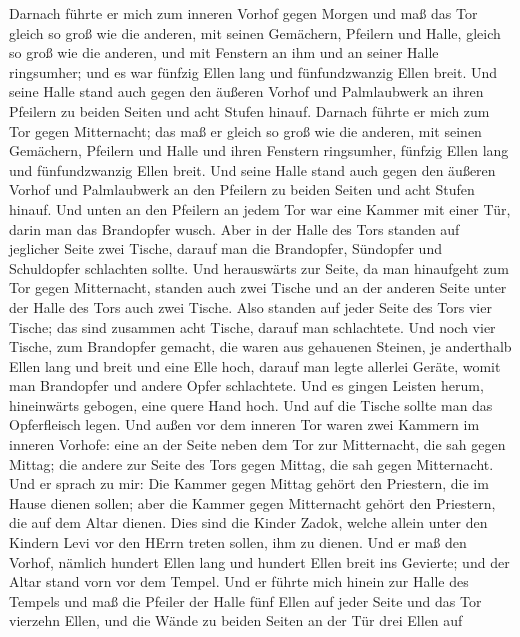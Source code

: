 Darnach führte er mich zum inneren Vorhof gegen Morgen und maß das Tor
gleich so groß wie die anderen,  mit seinen Gemächern,
Pfeilern und Halle, gleich so groß wie die anderen, und mit Fenstern an
ihm und an seiner Halle ringsumher; und es war fünfzig Ellen lang und
fünfundzwanzig Ellen breit.  Und seine Halle stand auch
gegen den äußeren Vorhof und Palmlaubwerk an ihren Pfeilern zu beiden
Seiten und acht Stufen hinauf.  Darnach führte er mich zum
Tor gegen Mitternacht; das maß er gleich so groß wie die anderen,
 mit seinen Gemächern, Pfeilern und Halle und ihren
Fenstern ringsumher, fünfzig Ellen lang und fünfundzwanzig Ellen breit.
 Und seine Halle stand auch gegen den äußeren Vorhof und
Palmlaubwerk an den Pfeilern zu beiden Seiten und acht Stufen hinauf.
 Und unten an den Pfeilern an jedem Tor war eine Kammer mit
einer Tür, darin man das Brandopfer wusch.  Aber in der
Halle des Tors standen auf jeglicher Seite zwei Tische, darauf man die
Brandopfer, Sündopfer und Schuldopfer schlachten sollte. 
Und herauswärts zur Seite, da man hinaufgeht zum Tor gegen Mitternacht,
standen auch zwei Tische und an der anderen Seite unter der Halle des
Tors auch zwei Tische.  Also standen auf jeder Seite des
Tors vier Tische; das sind zusammen acht Tische, darauf man schlachtete.
 Und noch vier Tische, zum Brandopfer gemacht, die waren
aus gehauenen Steinen, je anderthalb Ellen lang und breit und eine Elle
hoch, darauf man legte allerlei Geräte, womit man Brandopfer und andere
Opfer schlachtete.  Und es gingen Leisten herum,
hineinwärts gebogen, eine quere Hand hoch. Und auf die Tische sollte man
das Opferfleisch legen.  Und außen vor dem inneren Tor
waren zwei Kammern im inneren Vorhofe: eine an der Seite neben dem Tor
zur Mitternacht, die sah gegen Mittag; die andere zur Seite des Tors
gegen Mittag, die sah gegen Mitternacht.  Und er sprach zu
mir: Die Kammer gegen Mittag gehört den Priestern, die im Hause dienen
sollen;  aber die Kammer gegen Mitternacht gehört den
Priestern, die auf dem Altar dienen. Dies sind die Kinder Zadok, welche
allein unter den Kindern Levi vor den HErrn treten sollen, ihm zu
dienen.  Und er maß den Vorhof, nämlich hundert Ellen lang
und hundert Ellen breit ins Gevierte; und der Altar stand vorn vor dem
Tempel.  Und er führte mich hinein zur Halle des Tempels
und maß die Pfeiler der Halle fünf Ellen auf jeder Seite und das Tor
vierzehn Ellen, und die Wände zu beiden Seiten an der Tür drei Ellen auf
